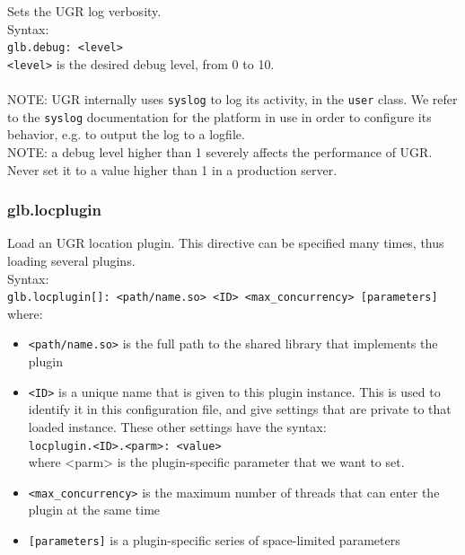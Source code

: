 \documentclass[12pt]{article} %
\begin{document}
 Sets the UGR log verbosity.\\
 
 Syntax:\\

\verb"glb.debug: <level>"\\

\verb"<level>" is the desired debug level, from 0 to 10.\\ \\
 NOTE: UGR internally uses \verb"syslog" to log its activity, in the \verb"user" class. We refer to the \verb"syslog" documentation for the platform in use in order to configure its behavior, e.g. to output the log to a logfile.\\
 
  NOTE: a debug level higher than 1 severely affects the performance of UGR. Never set it to a value higher than 1 in a production server.\\

\subsubsection{\label{glb.locplugin}glb.locplugin}

 Load an UGR location plugin. This directive can be specified many times, thus loading several plugins.\\
 
 Syntax:\\

\verb"glb.locplugin[]: <path/name.so> <ID> <max_concurrency> [parameters]"\\

where:

\begin{itemize}
\item \verb"<path/name.so>" is the full path to the shared library that implements the plugin
\item \verb"<ID>" is a unique name that is given to this plugin instance. This is used to identify it in this configuration file, and give settings that are private to that loaded instance. These other settings have the syntax:\\
      \verb"locplugin.<ID>.<parm>: <value>"\\
     where <parm> is the plugin-specific parameter that we want to set.
\item \verb"<max_concurrency>" is the maximum number of threads that can enter the plugin at the same time
\item \verb"[parameters]" is a plugin-specific series of space-limited parameters
\end{itemize}
\end{document}

